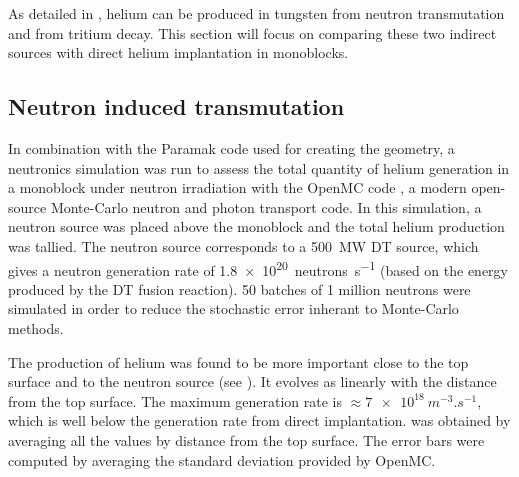 As detailed in , helium can be produced in tungsten from neutron transmutation and from tritium decay.
This section will focus on comparing these two indirect sources with direct helium implantation in monoblocks.

\subsection{Neutron induced transmutation}

In combination with the Paramak code  used for creating the geometry, a neutronics simulation was run to assess the total quantity of helium generation in a monoblock under neutron irradiation with the OpenMC code , a modern open-source Monte-Carlo neutron and photon transport code.
In this simulation, a neutron source was placed above the monoblock and the total helium production was tallied.
The neutron source corresponds to a \SI{500}{MW} DT source, which gives a neutron generation rate of \SI{1.8e20}{neutrons.s^{-1}} (based on the energy produced by the DT fusion reaction).
50 batches of 1 million neutrons were simulated in order to reduce the stochastic error inherant to Monte-Carlo methods.

The production of helium was found to be more important close to the top surface and to the neutron source (see ).
It evolves as linearly with the distance from the top surface.
The maximum generation rate is $\approx \SI{7e18}{m^{-3}.s^{-1}}$, which is well below the generation rate from direct implantation.
 was obtained by averaging all the values by distance from the top surface.
The error bars were computed by averaging the standard deviation provided by OpenMC.


